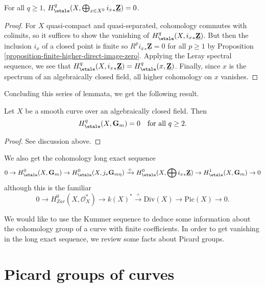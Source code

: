 \begin{lemma}
\label{lemma-cohomology-istar-Z}
For all $q \geq 1$, $H_\etale^q(X, \bigoplus_{x \in X^0} {i_x}_*
\underline{\mathbf{Z}}) = 0$.
\end{lemma}

\begin{proof}
For $X$ quasi-compact and quasi-separated, cohomology commutes with colimits,
so it suffices to show the vanishing of $H_\etale^q(X, {i_x}_*
\underline{\mathbf{Z}})$. But then the inclusion $i_x$ of a closed point is
finite so $R^p {i_x}_* \underline{\mathbf{Z}} = 0$ for all $p \geq 1$ by
Proposition \ref{proposition-finite-higher-direct-image-zero}.
Applying the Leray spectral sequence, we see that
$H_\etale^q(X, {i_x}_* \underline{\mathbf{Z}}) =
H_\etale^q(x, \underline{\mathbf{Z}})$.
Finally, since $x$ is the spectrum of an
algebraically closed field, all higher cohomology on $x$ vanishes.
\end{proof}

\noindent
Concluding this series of lemmata, we get the following result.

\begin{theorem}
\label{theorem-vanishing-cohomology-Gm-curve}
Let $X$ be a smooth curve over an algebraically closed field. Then
$$
H_\etale^q(X, \mathbf{G}_m) = 0 \ \ \text{ for all } q \geq 2.
$$
\end{theorem}

\begin{proof}
See discussion above.
\end{proof}

\noindent
We also get the cohomology long exact sequence
$$
0 \to
H_\etale^0(X, \mathbf{G}_m) \to
H_\etale^0(X, j_*\mathbf{G}_{m\eta}) \xrightarrow{\div}
H_\etale^0(X, \bigoplus {i_x}_*\underline{\mathbf{Z}}) \to
H_\etale^1(X, \mathbf{G}_m) \to 0
$$
although this is the familiar
$$
0 \to H_{Zar}^0(X, \mathcal{O}_X^*) \to k(X)^* \xrightarrow{\div} \text{Div}(X)
\to \text{Pic}(X) \to 0.
$$

\medskip\noindent
We would like to use the Kummer sequence to deduce some information about the
cohomology group of a curve with finite coefficients. In order to get vanishing
in the long exact sequence, we review some facts about Picard groups.





\section{Picard groups of curves}
\label{section-pic-curves}

